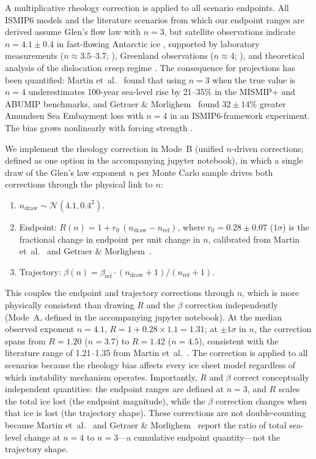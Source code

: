 \documentclass[12pt]{article}
\begin{document}
A multiplicative rheology correction is applied to all scenario endpoints. All ISMIP6 models and the literature scenarios from which our endpoint ranges are derived assume Glen's flow law with $n = 3$, but satellite observations indicate $n = 4.1 \pm 0.4$ in fast-flowing Antarctic ice \citep{Millstein2022}, supported by laboratory measurements ($n \approx 3.5$--3.7; \cite{Fan2025}), Greenland observations ($n \approx 4$; \cite{Bons2018}), and theoretical analysis of the dislocation creep regime \citep{Ranganathan2024}. The consequence for projections has been quantified: Martin et~al.~\citep{Martin2026} found that using $n = 3$ when the true value is $n = 4$ underestimates 100-year sea-level rise by 21--35\% in the MISMIP+ and ABUMIP benchmarks, and Getraer \& Morlighem~\citep{GetraerMorlighem2025} found $32 \pm 14$\% greater Amundsen Sea Embayment loss with $n = 4$ in an ISMIP6-framework experiment. The bias grows nonlinearly with forcing strength \citep{Martin2026}.

We implement the rheology correction in Mode~B (unified $n$-driven corrections; defined as one option in the accompanying jupyter notebook), in which a single draw of the Glen's law exponent $n$ per Monte Carlo sample drives both corrections through the physical link to $n$:
\begin{enumerate}
\item $n_{\mathrm{draw}} \sim \mathcal{N}(4.1, 0.4^2)$.
\item Endpoint: $R(n) = 1 + r_0\,(n_{\mathrm{draw}} - n_{\mathrm{ref}})$, where $r_0 = 0.28 \pm 0.07$ ($1\sigma$) is the fractional change in endpoint per unit change in $n$, calibrated from Martin et~al.~\citep{Martin2026} and Getraer \& Morlighem~\citep{GetraerMorlighem2025}.
\item Trajectory: $\beta(n) = \beta_{\mathrm{ref}} \cdot (n_{\mathrm{draw}} + 1)/(n_{\mathrm{ref}} + 1)$.
\end{enumerate}
This couples the endpoint and trajectory corrections through $n$, which is more physically consistent than drawing $R$ and the $\beta$ correction independently (Mode~A, defined in the accompanying jupyter notebook). At the median observed exponent $n = 4.1$, $R = 1 + 0.28 \times 1.1 = 1.31$; at $\pm 1\sigma$ in $n$, the correction spans from $R = 1.20$ ($n = 3.7$) to $R = 1.42$ ($n = 4.5$), consistent with the literature range of 1.21--1.35 from Martin et~al.~\citep{Martin2026}. The correction is applied to all scenarios because the rheology bias affects every ice sheet model regardless of which instability mechanism operates. Importantly, $R$ and $\beta$ correct conceptually independent quantities: the endpoint ranges are defined at $n = 3$, and $R$ scales the total ice lost (the endpoint magnitude), while the $\beta$ correction changes when that ice is lost (the trajectory shape). These corrections are not double-counting because Martin et~al.~\citep{Martin2026} and Getraer \& Morlighem~\citep{GetraerMorlighem2025} report the ratio of total sea-level change at $n = 4$ to $n = 3$---a cumulative endpoint quantity---not the trajectory shape.
\end{document}
